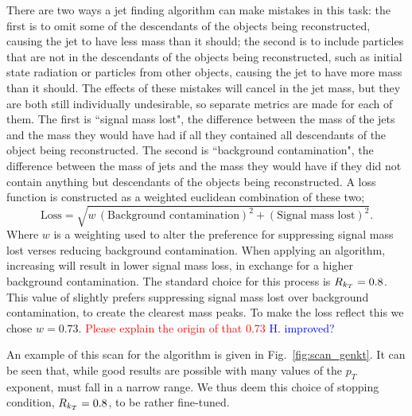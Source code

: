 There are two ways a jet finding algorithm can make mistakes in this task:
the first is to omit some of the descendants of the objects being reconstructed, causing the jet to have less mass than it should;
the second is to include particles that are not in the descendants of the objects being reconstructed, such as initial state radiation or particles from other objects,
causing the jet to have more mass than it should.
The effects of these mistakes will cancel in the jet mass,
but they are both still individually undesirable,
so separate metrics are made for each of them.
The first is ``signal mass lost", the difference between the mass of the jets and the mass they would have had if all they contained all descendants of the object being reconstructed.
The second is ``background contamination", the difference between the mass of jets and the mass they would have if they did not contain anything but descendants of the objects being reconstructed.
A loss function is constructed as a weighted euclidean combination of these two;
\begin{equation}\label{eqn:loss}
\text{Loss} = \sqrt{w\,(\text{Background contamination})^2 + (\text{Signal mass lost})^2}.
\end{equation}
Where \(w\) is a weighting used to alter the preference for suppressing signal mass lost verses reducing background contamination.
When applying an \antikt{} algorithm, increasing \ktstoppingdeltar{} will result in lower signal mass loss, in exchange for a higher background contamination.
The standard choice for this process is \(R_{k_T}{}=0.8\).
This value of \ktstoppingdeltar{} slightly prefers suppressing signal mass lost over background contamination,
to create the clearest mass peaks.
To make the loss reflect this we chose \(w = 0.73\).
{\textcolor{red}{Please explain the origin of that 0.73}} {\textcolor{blue}{H. improved?}}

An example of this scan for the \genkt{} algorithm is given in Fig.~\ref{fig:scan_genkt}. 
It can be seen that, while good results are possible with many values of the \(p_T\) exponent,
                \ktstoppingdeltar{} must fall in a narrow range. We thus deem this choice of  stopping condition, \(R{}_{k_T}=0.8\), to be rather fine-tuned.

